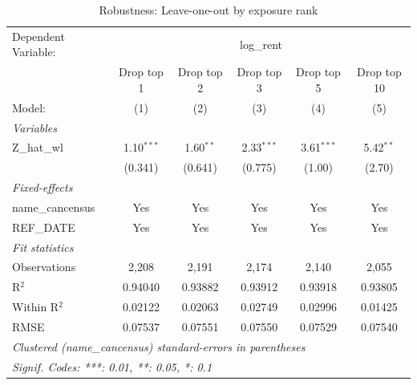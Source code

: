 
\begin{table}[htbp]
   \caption{\label{tab:robustness_loo} Robustness: Leave-one-out by exposure rank}
   \centering
   \begin{tabular}{lccccc}
      \tabularnewline \midrule \midrule
      Dependent Variable: & \multicolumn{5}{c}{log\_rent}\\
                       & Drop top 1   & Drop top 2  & Drop top 3   & Drop top 5   & Drop top 10 \\   
      Model:           & (1)          & (2)         & (3)          & (4)          & (5)\\  
      \midrule
      \emph{Variables}\\
      Z\_hat\_wl       & 1.10$^{***}$ & 1.60$^{**}$ & 2.33$^{***}$ & 3.61$^{***}$ & 5.42$^{**}$\\   
                       & (0.341)      & (0.641)     & (0.775)      & (1.00)       & (2.70)\\   
      \midrule
      \emph{Fixed-effects}\\
      name\_cancensus  & Yes          & Yes         & Yes          & Yes          & Yes\\  
      REF\_DATE        & Yes          & Yes         & Yes          & Yes          & Yes\\  
      \midrule
      \emph{Fit statistics}\\
      Observations     & 2,208        & 2,191       & 2,174        & 2,140        & 2,055\\  
      R$^2$            & 0.94040      & 0.93882     & 0.93912      & 0.93918      & 0.93805\\  
      Within R$^2$     & 0.02122      & 0.02063     & 0.02749      & 0.02996      & 0.01425\\  
      RMSE             & 0.07537      & 0.07551     & 0.07550      & 0.07529      & 0.07540\\  
      \midrule \midrule
      \multicolumn{6}{l}{\emph{Clustered (name\_cancensus) standard-errors in parentheses}}\\
      \multicolumn{6}{l}{\emph{Signif. Codes: ***: 0.01, **: 0.05, *: 0.1}}\\
   \end{tabular}
\end{table}


